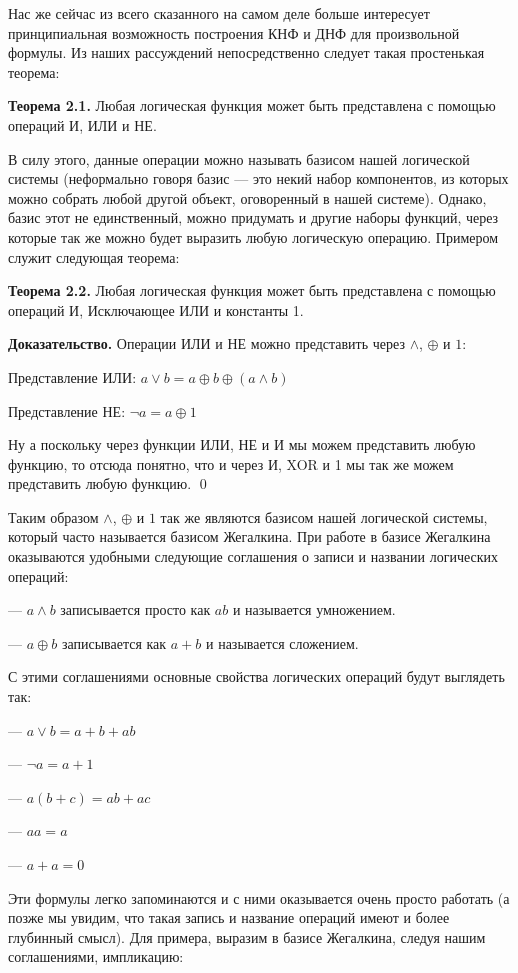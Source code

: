 Нас же сейчас из всего сказанного на самом деле больше интересует принципиальная возможность построения КНФ и ДНФ для произвольной формулы. Из наших рассуждений непосредственно следует такая простенькая теорема:

{\bfseries Теорема 2.1.} Любая логическая функция может быть представлена с помощью операций И, ИЛИ и НЕ.

В силу этого, данные операции можно называть базисом нашей логической системы (неформально говоря базис — это некий набор компонентов, из которых можно собрать любой другой объект, оговоренный в нашей системе). Однако, базис этот не единственный, можно придумать и другие наборы функций, через которые так же можно будет выразить любую логическую операцию. Примером служит следующая теорема:

{\bfseries Теорема 2.2.} Любая логическая функция может быть представлена с помощью операций И, Исключающее ИЛИ и константы 1.

{\bfseries Доказательство.} Операции ИЛИ и НЕ можно представить через $\wedge$, $\oplus$ и $1$:

Представление ИЛИ: $a\vee b = a \oplus b \oplus (a\wedge b)$

Представление НЕ: $\neg a = a \oplus 1$

Ну а поскольку через функции ИЛИ, НЕ и И мы можем представить любую функцию, то отсюда понятно, что и через И, XOR и 1 мы так же можем представить любую функцию. \qed

Таким образом $\wedge$, $\oplus$ и $1$ так же являются базисом нашей логической системы, который часто называется базисом Жегалкина. При работе в базисе Жегалкина оказываются удобными следующие соглашения о записи и названии логических операций:

— $a\wedge b$ записывается просто как $ab$ и называется умножением.

— $a \oplus b$ записывается как $a + b$ и называется сложением.

С этими соглашениями основные свойства логических операций будут выглядеть так:

— $a\vee b=a + b +ab$

— $\neg a = a + 1$

— $a(b+c) = ab + ac$

— $aa = a$

— $a + a = 0$

Эти формулы легко запоминаются и с ними оказывается очень просто работать (а позже мы увидим, что такая запись и название операций имеют и более глубинный смысл). Для примера, выразим в базисе Жегалкина, следуя нашим соглашениями, импликацию:

